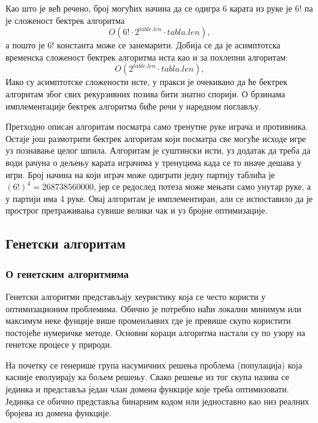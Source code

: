 \documentclass[a4paper, 12pt, ngerman]{article}
\let\oldsubsection\subsection
\renewcommand\subsection{\clearpage\oldsubsection}
\begin{document}
Као што је већ речено, број могућих начина да се одигра 6 карата из руке је $6!$ па је сложеност бектрек алгоритма
$$O(6! \cdot 2^{table.len} \cdot tabla.len), $$
а пошто је $6!$ константа може се занемарити. Добија се да је асимптотска временска сложеност бектрек алгоритма иста као и за похлепни алгоритам:
$$O(2^{table.len} \cdot tabla.len), $$
Иако су асимптотске сложености исте, у пракси је очекивано да ће бектрек алгоритам због свих рекурзивних позива бити знатно спорији. О брзинама имплементације бектрек алгоритма биће речи у наредном поглављу.

Претходно описан алгоритам посматра само тренутне руке играча и противника. Остаје још размотрити бектрек алгоритам који посматра све могуће исходе игре уз познавање целог шпила. Алгоритам је суштински исти, уз додатак да треба да води рачуна о дељењу карата играчима у тренуцима када се то иначе дешава у игри. Број начина на који играч може одиграти једну партију таблића је $(6!)^4 = 268738560000$, јер се редослед потеза може мењати само унутар руке, а у партији има 4 руке. Овај алгоритам је имплементиран, али се испоставило да је прострог претраживања сувише велики чак и уз бројне оптимизације.

\subsection{Генетски алгоритам}
\subsubsection{О генетским алгоритмима}
Генетски алгоритми представљају хеуристику која се често користи у оптимизационим проблемима. Обично је потребно наћи локални минимум или максимум неке фунције више променљивих где је превише скупо користити постојеће нумеричке методе. Основни кораци алгоритма настали су по узору на генетске процесе у природи.

На почетку се генерише група насумичних решења проблема (популација) која касније еволуирају ка бољем решењу. Свако решење из тог скупа назива се јединка и представља један члан домена функције које треба оптимизовати. Јединка се обично представља бинарним кодом или једноставно као низ реалних бројева из домена функције.
\end{document}
